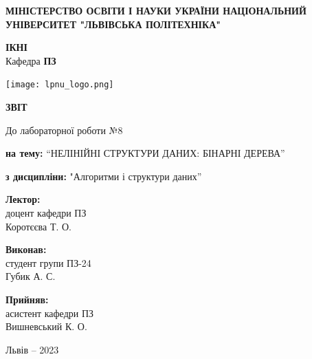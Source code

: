 \documentclass[12pt]{extarticle}
\begin{document}
\begin{titlepage}
    \begin{center}
        \textbf{\normalsize{\MakeUppercase{
            Міністерство Освіти і науки України
            Національний університет "Львівська політехніка"
        }}}

        \begin{flushright}
        \textbf{ІКНІ}\\
        Кафедра \textbf{ПЗ}
        \end{flushright}
        \vspace{15mm}

        \texttt{[image: lpnu\_logo.png]}

        \vspace*{\fill}

        \textbf{\normalsize{\MakeUppercase{Звіт}}}
            
        До лабораторної роботи №8

        \textbf{на тему:} “НЕЛІНІЙНІ СТРУКТУРИ ДАНИХ: БІНАРНІ ДЕРЕВА”

        \textbf{з дисципліни:} "Алгоритми і структури даних”
            
        \vspace*{\fill}

        \begin{flushright}

            \textbf{Лектор:}\\
            доцент кафедри ПЗ\\
            Коротєєва Т. О.\\
            \vspace{12pt}

            \textbf{Виконав:}\\
            студент групи ПЗ-24\\
            Губик А. С.\\
            \vspace{12pt}

            \textbf{Прийняв:}\\
            асистент кафедри ПЗ\\
            Вишневський К. О.\\
        \vspace{12pt}
        \end{flushright}

        Львів -- 2023
            
            
    \end{center}
\end{titlepage}
\end{document}
